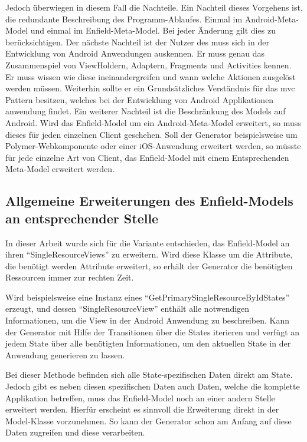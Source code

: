 Jedoch überwiegen in diesem Fall die Nachteile. Ein Nachteil dieses Vorgehens ist, die redundante Beschreibung des Programm-Ablaufes. Einmal im Android-Meta-Model und einmal im Enfield-Meta-Model. Bei jeder Änderung gilt dies zu berücksichtigen. 
Der nächste Nachteil ist der Nutzer des muss sich in der Entwicklung von Android Anwendungen auskennen. Er muss genau das Zusammenspiel von ViewHoldern, Adaptern, Fragments und Activities kennen. Er muss wissen wie diese ineinandergreifen und wann welche Aktionen ausgelöst werden müssen. Weiterhin sollte er ein Grundsätzliches Verständnis für das \acf{mvc} Pattern besitzen, welches bei der Entwicklung von Android Applikationen anwendung findet.
Ein weiterer Nachteil ist die Beschränkung des Models auf Android. Wird das Enfield-Model um ein Android-Meta-Model erweitert, so muss dieses für jeden einzelnen Client geschehen. Soll der Generator beispielsweise um Polymer-Webkomponente oder einer iOS-Anwendung erweitert werden, so müsste für jede einzelne Art von Client, das Enfield-Model mit einem Entsprechenden Meta-Model erweitert werden.

\subsection{Allgemeine Erweiterungen des Enfield-Models an entsprechender Stelle}

In dieser Arbeit wurde sich für die Variante entschieden, das Enfield-Model an ihren \enquote{SingleResourceViews} zu erweitern.
Wird diese Klasse um die  Attribute, die benötigt werden Attribute erweitert, so erhält der Generator die benötigten Ressourcen immer zur rechten Zeit.

Wird beispielsweise eine Instanz eines \enquote{GetPrimarySingleResourceByIdStates} erzeugt, und dessen \enquote{SingleResourceView} enthält alle notwendigen Informationen, um die View in der Android Anwendung zu beschreiben. Kann der Generator mit Hilfe der Transitionen über die States iterieren und verfügt an jedem State über alle benötigten Informationen, um den aktuellen State in der Anwendung generieren zu lassen.

Bei dieser Methode befinden sich alle State-spezifischen Daten direkt am State. Jedoch gibt es neben diesen spezifischen Daten auch Daten, welche die komplette Applikation betreffen, muss das Enfield-Model noch an einer andern Stelle erweitert werden. 
Hierfür erscheint es sinnvoll die Erweiterung direkt in der Model-Klasse vorzunehmen. So kann der Generator schon am Anfang auf diese Daten zugreifen und diese verarbeiten.

